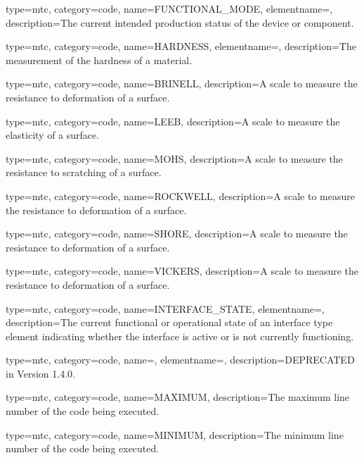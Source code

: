 {
  type=mtc,
  category=code,
  name={FUNCTIONAL\_MODE},
  elementname=,
  description={The current intended production status of the device or component.}
}

{
  type=mtc,
  category=code,
  name={HARDNESS},
  elementname=,
  description={The measurement of the hardness of a material.}
}

{
  type=mtc,
  category=code,
  name={BRINELL},
  description={A scale to measure the resistance to deformation of a surface.}
}

{
  type=mtc,
  category=code,
  name={LEEB},
  description={A scale to measure the elasticity of a surface.}
}

{
  type=mtc,
  category=code,
  name={MOHS},
  description={A scale to measure the resistance to scratching of a surface.}
}

{
  type=mtc,
  category=code,
  name={ROCKWELL},
  description={A scale to measure the resistance to deformation of a surface.}
}

{
  type=mtc,
  category=code,
  name={SHORE},
  description={A scale to measure the resistance to deformation of a surface.}
}

{
  type=mtc,
  category=code,
  name={VICKERS},
  description={A scale to measure the resistance to deformation of a surface.}
}

{
  type=mtc,
  category=code,
  name={INTERFACE\_STATE},
  elementname=,
  description={The current functional or operational state of an \gls{interface} type element indicating whether the interface is active or is not currently functioning.}
}

{
  type=mtc,
  category=code,
  name=,
  elementname=,
  description={DEPRECATED in Version 1.4.0.}
}

{
  type=mtc,
  category=code,
  name={MAXIMUM},
  description={The maximum line number of the code being executed.}
}

{
  type=mtc,
  category=code,
  name={MINIMUM},
  description={The minimum line number of the code being executed.}
}

